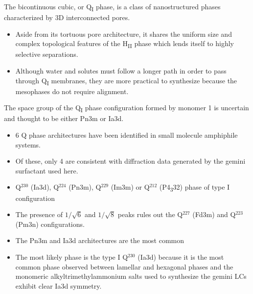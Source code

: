   The bicontinuous cubic, or Q\textsubscript{I} phase, is a class 
  of nanostructured phases characterized by 3D interconnected pores.
  \begin{itemize}
    \item Aside from its tortuous pore architecture, it shares the 
    uniform size and complex topological features of the H\textsubscript{II} phase
    which lends itself to highly selective separations.
    \item Although water and solutes must follow a longer path in order to pass
    through Q\textsubscript{I} membranes, they are more practical to synthesize
    because the mesophases do not require alignment. 
  \end{itemize}
  
  The space group of the Q\textsubscript{I} phase configuration formed by
  monomer 1 is uncertain and thought to be either Pn3m or Ia3d.  %
  \begin{itemize}
    \item 6 Q phase architectures have been identified in small molecule
    amphiphile systems.~\cite{mariani_cubic_1988}
    \item Of these, only 4 are consistent with diffraction data generated
    by the gemini surfactant used here.~\cite{pindzola_cross-linked_2003}
    \item Q$^{230}$ (Ia3d), Q$^{224}$ (Pn3m), Q$^{229}$ (Im3m) or Q$^{212}$ (P4\textsubscript{3}32) phase of type I configuration
    \item The presence of $1 / \sqrt{6}$ and $1 / \sqrt{8}$ peaks rules out the
    Q$^{227}$ (Fd3m) and Q$^{223}$ (Pm3n) configurations.
    \item The Pn3m and Ia3d architectures are the most common~\cite{mariani_cubic_1988,wiesenauer_nanoporous_2012}
    \item The most likely phase is the type I Q$^{230}$ (Ia3d) because it is the
    most common phase observed between lamellar and hexagonal phases and the
    monomeric alkyltrimethylammonium salts used to synthesize the gemini LCs
    exhibit clear Ia3d symmetry.
  \end{itemize}

